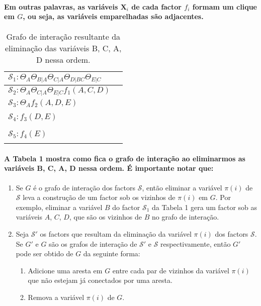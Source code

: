 \documentclass[a4paper,10pt]{article}
\theoremstyle{plain}
\begin{document}
\paragraph{
  Em outras palavras, as variáveis $\textbf{X}_i$ de cada factor $f_i$ formam um clique em $G$, ou
  seja, as variáveis emparelhadas são adjacentes.
}

\begin{table}[h]
  \begin{center}
    \begin{tabular}{l | c}
      $\mathcal{S}_1: \Theta_A \Theta_{B|A} \Theta_{C|A} \Theta_{D|BC} \Theta_{E|C}$ &  \\
      \hline
      $\mathcal{S}_2: \Theta_A \Theta_{C|A} \Theta_{E|C} f_1(A, C, D)$ &  \\
      \hline
      $\mathcal{S}_3: \Theta_A f_2(A, D, E)$ &  \\
      \hline
      & \\
      $\mathcal{S}_4: f_3(D, E)$ &  \\
      & \\
      \hline
      & \\
      $\mathcal{S}_5: f_4(E)$ &  \\
      & \\
    \end{tabular}
    \caption{Grafo de interação resultante da eliminação das variáveis B, C, A, D nessa ordem.}
  \end{center}
\end{table}

\paragraph{
  A Tabela 1 mostra como fica o grafo de interação ao eliminarmos as variáveis B, C, A, D nessa 
  ordem. É importante notar que:
}

\begin{enumerate}
  \item Se $G$ é o grafo de interação dos factors $\mathcal{S}$, então eliminar a variável $\pi(i)$
    de $\mathcal{S}$ leva a construção de um factor sob os vizinhos de $\pi(i)$ em $G$. Por exemplo,
    eliminar a variável $B$ do factor $\mathcal{S}_1$ da Tabela 1 gera um factor sob as variáveis
    $A$, $C$, $D$, que são os vizinhos de $B$ no grafo de interação.
  \item Seja $\mathcal{S}'$ os factors que resultam da eliminação da variável $\pi(i)$ dos factors
    $\mathcal{S}$. Se $G'$ e $G$ são os grafos de interação de $\mathcal{S}'$ e $\mathcal{S}$
    respectivamente, então $G'$ pode ser obtido de $G$ da seguinte forma:
    \begin{enumerate}
      \item Adicione uma aresta em $G$ entre cada par de vizinhos da variável $\pi(i)$ que não 
        estejam já conectados por uma aresta.
      \item Remova a variável $\pi(i)$ de $G$.
    \end{enumerate}
\end{enumerate}
\end{document}
